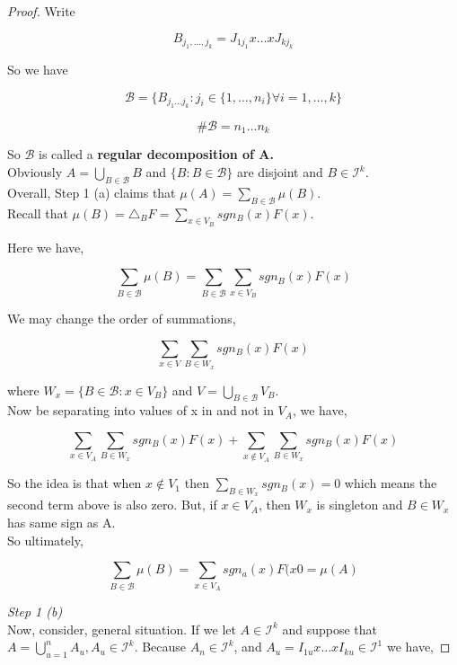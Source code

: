 \documentclass[11pt,fleqn]{book} %
\begin{document}
\begin{proof}
		Write

				$$B_{j_1, \dots, j_k} = J_{1 j_1} x \dots x J_{k j_k} $$

		So we have


				$$\mathcal{B} = \{B_{j_1 \dots j_k}: j_i \in \{1, \dots, n_i\} \forall i = 1, \dots, k  \} $$


				$$\#\mathcal{B} = n_1 \dots n_k $$ 

		So $\mathcal{B}$ is called a \textbf{regular decomposition of A.} \\

		Obviously $A = \bigcup_{B \in \mathcal{B}} B$ and $ \{B : B \in \mathcal{B} \}$ are disjoint and $B \in \mathcal{I}^k$. \\


		Overall, Step 1 (a) claims that $\mu(A) = \sum_{B \in \mathcal{B}} \mu(B)$. \\

		Recall that $\mu(B) = \triangle_B F = \sum_{x \in V_B} sgn_B (x) F(x)$. 

		Here we have, 

				$$\sum_{B \in \mathcal{B}} \mu(B) = \sum_{B \in \mathcal{B}}  \sum_{x \in V_B} sgn_B (x) F(x)  $$

		We may change the order of summations, 

				$$ \sum_{x \in V} \sum_{B \in W_x} sgn_B (x) F(x) $$

		where $W_x = \{B \in \mathcal{B}: x \in V_B \}$ and $V = \bigcup_{B \in \mathcal{B}} V_B$.\\


		Now be separating into values of x in and not in $V_A$,  we have, 

				$$\sum_{x \in V_A} \sum_{B \in W_x} sgn_B (x) F(x) + \sum_{x \notin V_A} \sum_{B \in W_x} sgn_B (x) F(x)   $$



		So the idea is that  when $x \notin V_1$ then $\sum_{B \in W_x} sgn_B (x) = 0$ which means the second term above is also zero. But, if $x \in V_A$, then $W_x$ is singleton and $B \in W_x$ has same sign as A. \\


		So ultimately, 

				$$\sum_{B \in \mathcal{B}} \mu(B)  = \sum_{x \in V_A} sgn_a (x) F(x0 = \mu(A)$$


		\textit{Step 1 (b)}\\

		Now, consider, general situation. If we let $A \in \mathcal{I}^k$ and suppose that $A = \bigcup_{u = 1}^n A_u, A_u \in \mathcal{I}^k $. Because $A_n \in \mathcal{I}^k$, and $A_u = I _{1u} x \dots x I_{ku} \in \mathcal{I}^1$ we have,



\end{proof}
\end{document}
